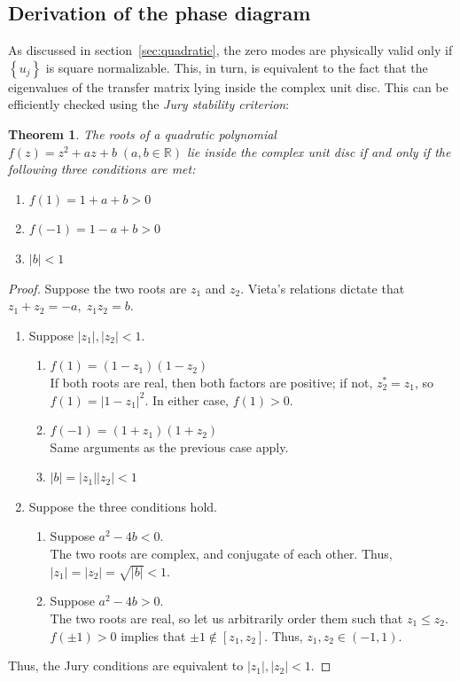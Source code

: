 \documentclass{article}
\newtheorem{theorem}{Theorem}[section]
\begin{document}
\subsection{Derivation of the phase diagram}\label{sec:phase}
As discussed in section~\ref{sec:quadratic}, the zero modes are physically valid only if $\left\{u_j\right\}$ is square normalizable.
This, in turn, is equivalent to the fact that the eigenvalues of the transfer matrix lying inside the complex unit disc.
This can be efficiently checked using the \emph{Jury stability criterion}:
\begin{theorem}
    The roots of a quadratic polynomial $f(z) = z^2 + az + b\;(a, b \in \mathbb{R})$ lie inside the complex unit disc
    if and only if the following three conditions are met:
    \begin{enumerate}
        \item $f(1) = 1 + a + b > 0$
        \item $f(-1) = 1 - a + b > 0$
        \item $|b| < 1$
    \end{enumerate}
\end{theorem}
\begin{proof}
    Suppose the two roots are $z_1$ and $z_2$.
    Vieta's relations dictate that $z_1 + z_2 = -a,\; z_1 z_2 = b$.
    \begin{enumerate}[label=\roman*)]
        \item Suppose $|z_1|, |z_2| < 1$.
            \begin{enumerate}[label=\arabic*.]
                \item $f(1) = (1 - z_1) (1 - z_2)$ \\
                    If both roots are real, then both factors are positive;
                    if not, $z_2^* = z_1$, so $f(1) = |1-z_1|^2$.
                    In either case, $f(1) > 0$.
                \item $f(-1) = (1 + z_1) (1 + z_2)$ \\
                    Same arguments as the previous case apply.
                \item $|b| = |z_1| |z_2| < 1$
            \end{enumerate}
        \item Suppose the three conditions hold.
            \begin{enumerate}
                \item Suppose $a^2 - 4b < 0$. \\
                    The two roots are complex, and conjugate of each other.
                    Thus, $|z_1| = |z_2| = \sqrt{|b|} < 1$.
                \item Suppose $a^2 - 4b > 0$. \\
                    The two roots are real, so let us arbitrarily order them such that $z_1 \leq z_2$.
                    $f(\pm 1) > 0$ implies that $\pm 1 \notin [z_1, z_2]$.
                    Thus, $z_1, z_2 \in (-1, 1)$.
            \end{enumerate}
    \end{enumerate}
    Thus, the Jury conditions are equivalent to $|z_1|, |z_2| < 1$.
\end{proof}
\end{document}
